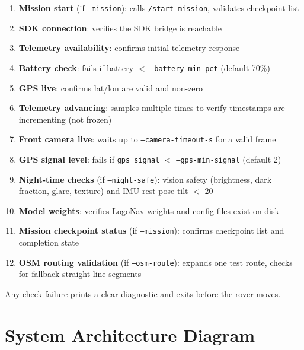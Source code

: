 \documentclass[11pt]{article}
\begin{document}
\begin{enumerate}[nosep]
  \item \textbf{Mission start} (if \texttt{--mission}): calls \texttt{/start-mission},
  validates checkpoint list
  \item \textbf{SDK connection}: verifies the SDK bridge is reachable
  \item \textbf{Telemetry availability}: confirms initial telemetry response
  \item \textbf{Battery check}: fails if battery $<$ \texttt{--battery-min-pct}
  (default 70\%)
  \item \textbf{GPS live}: confirms lat/lon are valid and non-zero
  \item \textbf{Telemetry advancing}: samples multiple times to verify timestamps are
  incrementing (not frozen)
  \item \textbf{Front camera live}: waits up to \texttt{--camera-timeout-s} for a
  valid frame
  \item \textbf{GPS signal level}: fails if \texttt{gps\_signal} $<$
  \texttt{--gps-min-signal} (default 2)
  \item \textbf{Night-time checks} (if \texttt{--night-safe}): vision safety
  (brightness, dark fraction, glare, texture) and IMU rest-pose tilt $<$ 20\textdegree
  \item \textbf{Model weights}: verifies LogoNav weights and config files exist on
  disk
  \item \textbf{Mission checkpoint status} (if \texttt{--mission}): confirms checkpoint
  list and completion state
  \item \textbf{OSM routing validation} (if \texttt{--osm-route}): expands one test
  route, checks for fallback straight-line segments
\end{enumerate}

Any check failure prints a clear diagnostic and exits before the rover moves.

\section{System Architecture Diagram}
\end{document}
